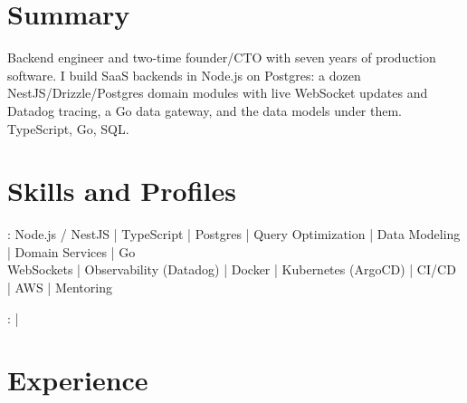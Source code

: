 \documentclass[print]{jack-resume}
\begin{document}
\pagecolor{darkmodeBackground}


\begin{minipage}[t][1cm][t]{.03\textwidth}
    \hfill
\end{minipage}

\section{Summary}
Backend engineer and two-time founder/CTO with seven years of production software. I build SaaS backends in Node.js on Postgres: a dozen NestJS/Drizzle/Postgres domain modules with live WebSocket updates and Datadog tracing, a Go data gateway, and the data models under them. TypeScript, Go, SQL.
\sectionsep

\section{Skills and Profiles}
:
Node.js / NestJS \hfill | \hfill
TypeScript \hfill | \hfill
Postgres \hfill | \hfill
Query Optimization \hfill | \hfill
Data Modeling \hfill | \hfill
Domain Services \hfill | \hfill
Go \\
\hspace{1.0cm} WebSockets \hfill | \hfill
Observability (Datadog) \hfill | \hfill
Docker \hfill | \hfill
Kubernetes (ArgoCD) \hfill | \hfill
CI/CD \hfill | \hfill
AWS \hfill | \hfill
Mentoring \\

\raggedright{
    :
      \href{https://www.linkedin.com/in/jack-sturtevant/}{ \ExternalLink} |
     \href{https://github.com/jacksturt}{ \ExternalLink}}

\section{Experience}
\end{document}

